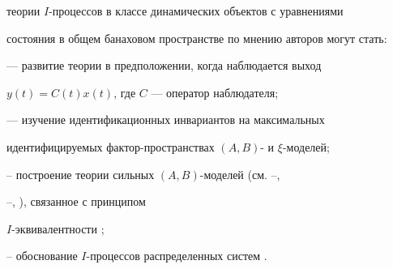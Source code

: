 теории $I$-процессов в классе динамических объектов с уравнениями 


состояния в общем банаховом пространстве по мнению авторов могут стать: 


 


--- развитие теории в предположении, когда наблюдается выход 


$y(t)=C(t)x(t)$, где $C$ --- оператор наблюдателя; 


 


--- изучение идентификационных инвариантов на максимальных 


идентифицируемых фактор-пространствах $(A,B)$- и $\xi$-моделей; 


 


-- построение теории сильных $(A,B)$-моделей (см. \cite{3}--\cite{5}, 


\cite{7}--\cite{9}, \cite{18}), связанное с принципом 


$I$-эквивалентности \cite{3}; 


 


-- обоснование $I$-процессов распределенных систем \cite{19}. 


 


 


